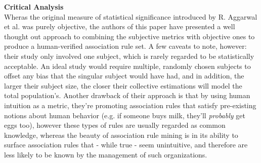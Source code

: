 \documentclass[paper=a4,fontsize=11pt]{report}	%
\begin{document}
\textbf{Critical Analysis}\\
Wheras the original measure of statistical significance introduced by R. Aggarwal et al.  was purely objective, the authors  of this paper have presented a well thought out approach to combining the subjective metrics with objective ones to produce a human-verified association rule set.  A few caveats to note, however: their study only involved one subject, which is rarely regarded to be statistically acceptable. An ideal study would require multiple, randomly chosen subjects to offset any bias that the singular subject would have had, and in addition, the larger their subject size, the closer their collective estimations will model the total population's.  Another drawback of their approach is that by using human intuition as a metric,  they're promoting association rules that satisfy pre-existing notions about human behavior (e.g. if someone buys milk, they'll \textit{probably} get eggs too), however these types of rules are usually regarded as common knowledge,  whereas the beauty of association rule mining is in its ability to surface association rules that - while true - seem unintuitive, and therefore are less likely to be known by the management of such organizations.


\end{document}
